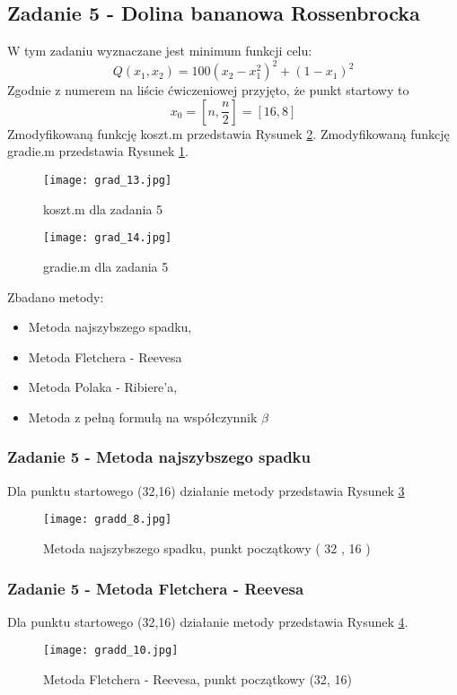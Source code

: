 \documentclass[a4paper,15pt]{article}
\begin{document}
\subsection{ Zadanie 5 - Dolina bananowa Rossenbrocka }
W tym zadaniu wyznaczane jest minimum funkcji celu:
\begin{equation*}
Q(x_{1},x_{2})=100(x_{2}-x_{1}^{2})^{2}+(1-x_{1})^2
\end{equation*}
Zgodnie z numerem na liście ćwiczeniowej przyjęto, że punkt startowy to
\begin{equation*}
x_{0}=\left[n,\frac{n}{2}\right]=\left[16,8\right]
\end{equation*}
Zmodyfikowaną funkcję koszt.m przedstawia Rysunek \ref{fig:grad_13}. Zmodyfikowaną funkcję gradie.m przedstawia Rysunek \ref{fig:grad_14}.
\begin{figure}[H]
\centerline{\texttt{[image: grad\_13.jpg]}}
\centering
\caption{koszt.m dla zadania 5}
\label{fig:grad_14}
\end{figure}
\begin{figure}[H]
\centerline{\texttt{[image: grad\_14.jpg]}}
\centering
\caption{gradie.m dla zadania 5}
\label{fig:grad_13}
\end{figure}
Zbadano metody:
\begin{itemize}
\item Metoda najszybszego spadku,
\item Metoda Fletchera - Reevesa
\item Metoda Polaka - Ribiere'a,
\item Metoda z pełną formułą na współczynnik \( \beta \)
\end{itemize}
\newpage
\subsubsection{Zadanie 5 - Metoda najszybszego spadku}
Dla punktu startowego (32,16) działanie metody przedstawia Rysunek \ref{fig:gradd_8}
\begin{figure}[H]
\centerline{\texttt{[image: gradd\_8.jpg]}}
\centering
\caption{Metoda najszybszego spadku, punkt początkowy ( 32 , 16 )}
\label{fig:gradd_8}
\end{figure}
\subsubsection{Zadanie 5 - Metoda Fletchera - Reevesa }
Dla punktu startowego (32,16) działanie metody przedstawia Rysunek \ref{fig:gradd_10}.
\begin{figure}[H]
\centerline{\texttt{[image: gradd\_10.jpg]}}
\centering
\caption{Metoda Fletchera - Reevesa, punkt początkowy (32, 16) }
\label{fig:gradd_10}
\end{figure}
\end{document}
